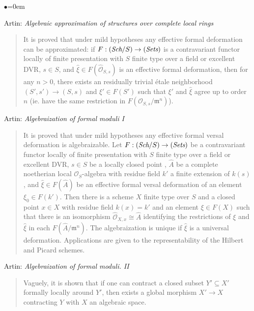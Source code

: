 \begin{list}{$\bullet$}{\leftmargin=0em}
\item Artin: \emph{Algebraic approximation of structures over
complete local rings} \cite{artin_approximation}
\begin{quote}
It is proved that under mild hypotheses any effective formal deformation can be
approximated: if $F: (\textit{Sch}/S) \to (\textit{Sets})$
is a contravariant functor
locally of finite presentation with $S$ finite type over a field or excellent
DVR, $s \in S$, and $\hat{\xi} \in F(\hat{\mathcal{O}}_{S, s})$ is an effective
formal
deformation, then for any $n > 0$, there exists an residually trivial \'etale
neighborhood $(S', s') \to (S, s)$ and $\xi' \in F(S')$ such that $\xi'$ and
$\hat{\xi}$ agree up to order $n$ (ie. have the same restriction in
$F(\mathcal{O}_{S, s} / \mathfrak m^n)$).
\end{quote}
\smallskip
\item
Artin: \emph{Algebraization of formal moduli I} \cite{artin_algebraizationI}
\begin{quote}
It is proved that under mild hypotheses any effective formal versal deformation
is algebraizable. Let $F: (\textit{Sch}/S) \to (\textit{Sets})$ be a
contravariant functor
locally of finite presentation with $S$ finite type over a field or excellent
DVR, $s \in S$ be a locally closed point , $\hat A$ be a complete noetherian
local $\mathcal{O}_S$-algebra with residue field $k'$ a finite extension of
$k(s)$,
and $\hat{\xi} \in F(\hat A)$ be an effective formal versal deformation of an
element $\xi_0 \in F(k')$. Then there is a scheme $X$ finite type over $S$ and
a closed point $x \in X$ with residue field $k(x) = k'$ and an element $\xi \in
F(X)$ such that there is an isomorphism $\hat{\mathcal{O}}_{X, x} \cong \hat{A}$
identifying the restrictions of $\xi$ and $\hat{\xi}$ in each $F(\hat A /
\mathfrak m^n)$. The algebraization is unique if $\hat{\xi}$ is a universal
deformation. Applications are given to the representability of the Hilbert
and Picard schemes.
\end{quote}
\smallskip
\item Artin: \emph{Algebraization of formal moduli. II}
\cite{artin_algebraizationII}
\begin{quote}
Vaguely, it is shown that if one can contract a closed subset $Y' \subseteq X'$
formally locally around $Y'$, then exists a global morphism $X' \to X$
contracting $Y$ with $X$ an algebraic space.
\end{quote}
\smallskip
\item

\end{list}
